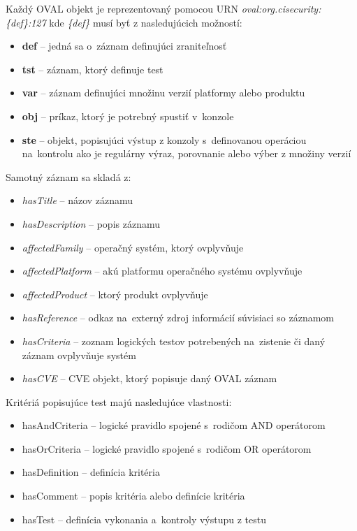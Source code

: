 \documentclass[12pt, a4paper, oneside]{book}
\begin{document}
Každý OVAL objekt je reprezentovaný pomocou URN \textit{oval:org.cisecurity:\{def\}:127} kde \textit{\{def\}} musí byť z nasledujúcich možností:
\begin{itemize}
\item \textbf{def} -- jedná sa o~záznam definujúci zraniteľnosť
\item \textbf{tst} -- záznam, ktorý definuje test
\item \textbf{var} -- záznam definujúci množinu verzií platformy alebo produktu
\item \textbf{obj} -- príkaz, ktorý je potrebný spustiť v~konzole
\item \textbf{ste} -- objekt, popisujúci výstup z konzoly s~definovanou operáciou na~kontrolu ako je regulárny výraz, porovnanie alebo výber z množiny verzií
\end{itemize}
Samotný záznam sa skladá z:
\begin{itemize}
\item \textit{hasTitle} -- názov záznamu
\item \textit{hasDescription} -- popis záznamu
\item \textit{affectedFamily} -- operačný systém, ktorý ovplyvňuje
\item \textit{affectedPlatform} -- akú platformu operačného systému ovplyvňuje
\item \textit{affectedProduct} -- ktorý produkt ovplyvňuje
\item \textit{hasReference} -- odkaz na~externý zdroj informácií súvisiaci so záznamom
\item \textit{hasCriteria} -- zoznam logických testov potrebených na~zistenie či daný záznam ovplyvňuje systém
\item \textit{hasCVE} -- CVE objekt, ktorý popisuje daný OVAL záznam
\end{itemize}
Kritériá popisujúce test majú nasledujúce vlastnosti:
\begin{itemize}
\item hasAndCriteria -- logické pravidlo spojené s~rodičom AND operátorom
\item hasOrCriteria -- logické pravidlo spojené s~rodičom OR operátorom
\item hasDefinition -- definícia kritéria
\item hasComment -- popis kritéria alebo definície kritéria
\item hasTest -- definícia vykonania a~kontroly výstupu z testu
\end{itemize}
\end{document}

